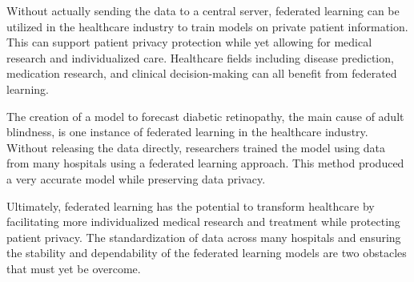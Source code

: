 Without actually sending the data to a central server, federated learning can be utilized in the healthcare industry to train models on private patient information. This can support patient privacy protection while yet allowing for medical research and individualized care. Healthcare fields including disease prediction, medication research, and clinical decision-making can all benefit from federated learning.

The creation of a model to forecast diabetic retinopathy, the main cause of adult blindness, is one instance of federated learning in the healthcare industry. Without releasing the data directly, researchers trained the model using data from many hospitals using a federated learning approach. This method produced a very accurate model while preserving data privacy.

Ultimately, federated learning has the potential to transform healthcare by facilitating more individualized medical research and treatment while protecting patient privacy. The standardization of data across many hospitals and ensuring the stability and dependability of the federated learning models are two obstacles that must yet be overcome.
